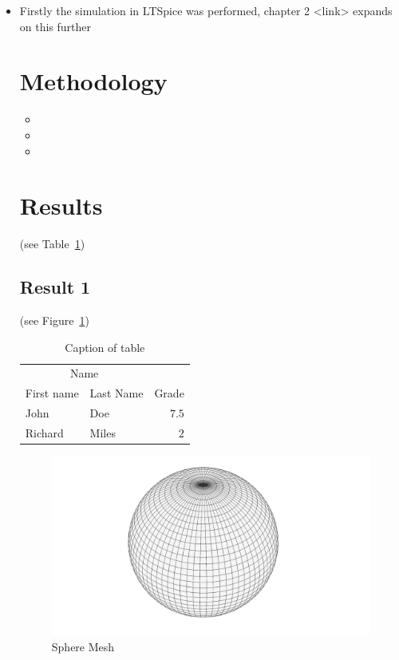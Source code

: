 \documentclass[	DIV=calc,%
							paper=a4,%
							fontsize=12pt,%
							twocolumn]{scrartcl}	 					%
\begin{document}
\begin{itemize}
	\item Firstly the simulation in LTSpice was performed, chapter 2 <link> expands on this further


\section*{Methodology}
\; \; %
\lipsum[6]
\begin{itemize}
	\item \lipsum[7] 
	\item \lipsum[7] 
	\item \lipsum[7] 
\end{itemize}

\lipsum[6]

\section*{Results}
\; \; %
\lipsum[7] (see Table~\ref{Tab1}) 

\subsection*{Result 1}
\; \; %
\lipsum[7] (see Figure~\ref{Figure 1})

\begin{table}
\caption{Caption of table}
\centering
	\begin{tabular}{llr}
		\toprule
		\multicolumn{2}{c}{Name} \\
		\cmidrule(r){1-2}
			First name & Last Name & Grade \\
		\midrule
			John & Doe & $7.5$ \\
			Richard & Miles & $2$ \\
		\bottomrule
	\end{tabular}
 \label{Tab1}
\end{table}


\begin{figure}[H]
    \centering
    \includegraphics[width=\columnwidth]{7.png}
    \caption{Sphere Mesh}
    \label{Figure 1}
\end{figure}


\end{itemize}
\end{document}
